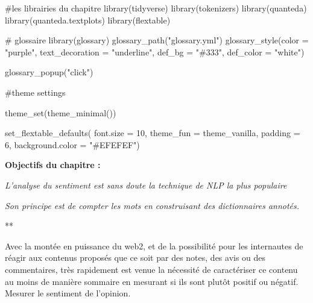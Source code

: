 \documentclass[
  letterpaper,
  DIV=11,
  numbers=noendperiod]{scrreprt}
\newenvironment{Shaded}{\begin{snugshade}}{\end{snugshade}}
\newcommand{\AttributeTok}[1]{\textcolor[rgb]{0.40,0.45,0.13}{#1}}
\newcommand{\CommentTok}[1]{\textcolor[rgb]{0.37,0.37,0.37}{#1}}
\newcommand{\DecValTok}[1]{\textcolor[rgb]{0.68,0.00,0.00}{#1}}
\newcommand{\FunctionTok}[1]{\textcolor[rgb]{0.28,0.35,0.67}{#1}}
\newcommand{\NormalTok}[1]{\textcolor[rgb]{0.00,0.23,0.31}{#1}}
\newcommand{\StringTok}[1]{\textcolor[rgb]{0.13,0.47,0.30}{#1}}
\begin{document}
\begin{Shaded}
\begin{Highlighting}[]
\CommentTok{\#les librairies du chapitre}
\FunctionTok{library}\NormalTok{(tidyverse)}
\FunctionTok{library}\NormalTok{(tokenizers)}
\FunctionTok{library}\NormalTok{(quanteda)}
\FunctionTok{library}\NormalTok{(quanteda.textplots)}
\FunctionTok{library}\NormalTok{(flextable)}

\CommentTok{\# glossaire}
\FunctionTok{library}\NormalTok{(glossary)}
\FunctionTok{glossary\_path}\NormalTok{(}\StringTok{"glossary.yml"}\NormalTok{)}
\FunctionTok{glossary\_style}\NormalTok{(}\AttributeTok{color =} \StringTok{"purple"}\NormalTok{, }
               \AttributeTok{text\_decoration =} \StringTok{"underline"}\NormalTok{,}
               \AttributeTok{def\_bg =} \StringTok{"\#333"}\NormalTok{,}
               \AttributeTok{def\_color =} \StringTok{"white"}\NormalTok{)}
\end{Highlighting}
\end{Shaded}

\begin{Shaded}
\begin{Highlighting}[]
\FunctionTok{glossary\_popup}\NormalTok{(}\StringTok{"click"}\NormalTok{)}

\CommentTok{\#theme settings}

\FunctionTok{theme\_set}\NormalTok{(}\FunctionTok{theme\_minimal}\NormalTok{()) }

\FunctionTok{set\_flextable\_defaults}\NormalTok{(}
  \AttributeTok{font.size =} \DecValTok{10}\NormalTok{, }\AttributeTok{theme\_fun =}\NormalTok{ theme\_vanilla,}
  \AttributeTok{padding =} \DecValTok{6}\NormalTok{,}
  \AttributeTok{background.color =} \StringTok{"\#EFEFEF"}\NormalTok{)}
\end{Highlighting}
\end{Shaded}

\textbf{Objectifs du chapitre :}

\emph{L'analyse du sentiment est sans doute la technique de NLP la plus
populaire}

\emph{Son principe est de compter les mots en construisant des
dictionnaires annotés.}

**

Avec la montée en puissance du web2, et de la possibilité pour les
internautes de réagir aux contenus proposés que ce soit par des notes,
des avis ou des commentaires, très rapidement est venue la nécessité de
caractériser ce contenu au moins de manière sommaire en mesurant si ils
sont plutôt positif ou négatif. Mesurer le sentiment de l'opinion.
\end{document}
